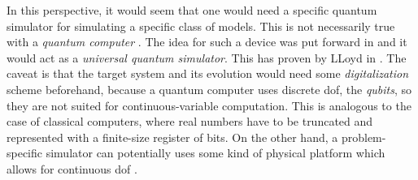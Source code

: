 In this perspective, it would seem that one would need a specific quantum simulator for simulating a specific class of models.
This is not necessarily true with a \emph{quantum computer} \cite{feynman1985quantum, nielsen2010quantum, schleich2007elements, stolze2008quantum}.
The idea for such a device was put forward in \cite{feynman1982simulation, feynman1985quantum} and it would act as a \emph{universal quantum simulator}.
This has proven by LLoyd in \cite{lloyd1996simulator}.
The caveat is that the target system and its evolution would need some \emph{digitalization} scheme beforehand, because a quantum computer uses discrete \ac{dof}, the \emph{qubits}, so they are not suited for continuous-variable computation.
This is analogous to the case of classical computers, where real numbers have to be truncated and represented with a finite-size register of bits.
On the other hand, a problem-specific simulator can potentially uses some kind of physical platform which allows for continuous \ac{dof} \cite{kendon2010quantum, wagner2010continuous}.




